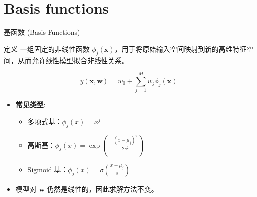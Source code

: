 \documentclass[12pt, aspectratio=169]{beamer}
\newcommand{\bw}{\mathbf{w}}
\newcommand{\bx}{\mathbf{x}}
\begin{document}
\section{Basis functions}
\begin{frame}{基函数 (Basis Functions)}
    \begin{block}{定义}
        一组固定的非线性函数 $\phi_j(\bx)$，用于将原始输入空间映射到新的高维特征空间，从而允许线性模型拟合非线性关系。
    \end{block}
    
    \begin{equation*}
        y(\bx, \bw) = w_0 + \sum_{j=1}^M w_j \phi_j(\bx)
    \end{equation*}
    
    \vspace{0.5cm}
    \begin{itemize}
        \item \textbf{常见类型}:
        \begin{itemize}
            \item 多项式基：$\phi_j(x) = x^j$
            \item 高斯基：$\phi_j(x) = \exp(-\frac{(x-\mu_j)^2}{2s^2})$
            \item Sigmoid 基：$\phi_j(x) = \sigma(\frac{x-\mu_j}{s})$
        \end{itemize}
        \item 模型对 $\bw$ 仍然是线性的，因此求解方法不变。
    \end{itemize}
\end{frame}

\end{document}
